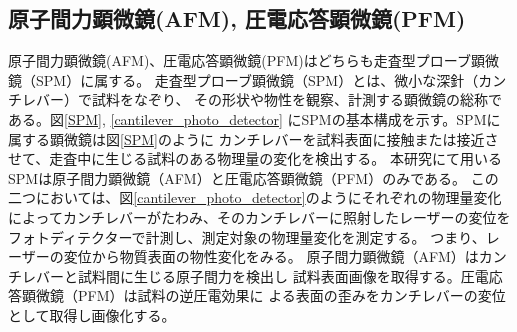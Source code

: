 \documentclass[dvipdfmx,12pt,a4paper]{jreport}
\begin{document}
			\newpage

			\subsection{原子間力顕微鏡(AFM), 圧電応答顕微鏡(PFM)}
			原子間力顕微鏡(AFM)、圧電応答顕微鏡(PFM)はどちらも走査型プローブ顕微鏡（SPM）に属する。
			走査型プローブ顕微鏡（SPM）とは、微小な深針（カンチレバー）で試料をなぞり、
			その形状や物性を観察、計測する顕微鏡の総称である。図\ref{SPM}, \ref{cantilever_photo_detector}
			にSPMの基本構成を示す。SPMに属する顕微鏡は図\ref{SPM}のように
			カンチレバーを試料表面に接触または接近させて、走査中に生じる試料のある物理量の変化を検出する。
			本研究にて用いるSPMは原子間力顕微鏡（AFM）と圧電応答顕微鏡（PFM）のみである。
			この二つにおいては、図\ref{cantilever_photo_detector}のようにそれぞれの物理量変化
			によってカンチレバーがたわみ、そのカンチレバーに照射したレーザーの変位を
			フォトディテクターで計測し、測定対象の物理量変化を測定する。
			つまり、レーザーの変位から物質表面の物性変化をみる。
			原子間力顕微鏡（AFM）はカンチレバーと試料間に生じる原子間力を検出し
			試料表面画像を取得する。圧電応答顕微鏡（PFM）は試料の逆圧電効果に
			よる表面の歪みをカンチレバーの変位として取得し画像化する。
\end{document}
